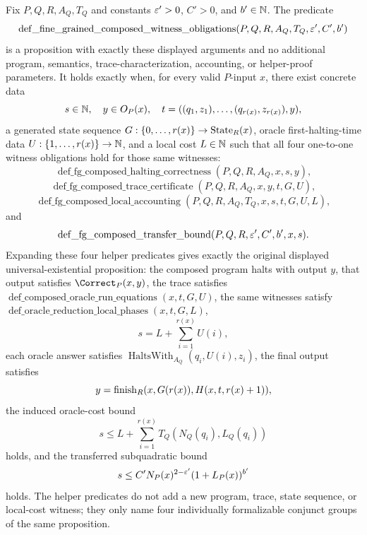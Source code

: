 \begin{definition}
  \label{def:fine-grained-composed-witness-obligations}
  Fix $P,Q,R,A_Q,T_Q$ and constants $\varepsilon'>0$, $C'>0$, and $b'\in\mathbb{N}$.  The
  predicate
  \[
    \operatorname{def\_fine\_grained\_composed\_witness\_obligations}
      (P,Q,R,A_Q,T_Q,\varepsilon',C',b')
  \]
  is a proposition with exactly these displayed arguments and no additional
  program, semantics, trace-characterization, accounting, or helper-proof
  parameters.  It holds exactly when, for every valid $P$-input $x$, there
  exist concrete data
  \[
    s\in\mathbb{N},\quad y\in O_P(x),\quad
    t=((q_1,z_1),\ldots,(q_{r(x)},z_{r(x)}),y),
  \]
  a generated state sequence $G:\{0,\ldots,r(x)\}\to\operatorname{State}_R(x)$, oracle
  first-halting-time data $U:\{1,\ldots,r(x)\}\to\mathbb{N}$, and a local cost
  $L\in\mathbb{N}$ such that all four one-to-one witness obligations hold for those
  same witnesses:
  \[
    \operatorname{def\_fg\_composed\_halting\_correctness}
      (P,Q,R,A_Q,x,s,y),
  \]
  \[
    \operatorname{def\_fg\_composed\_trace\_certificate}
      (P,Q,R,A_Q,x,y,t,G,U),
  \]
  \[
    \operatorname{def\_fg\_composed\_local\_accounting}
      (P,Q,R,A_Q,T_Q,x,s,t,G,U,L),
  \]
  and
  \[
    \operatorname{def\_fg\_composed\_transfer\_bound}
      (P,Q,R,\varepsilon',C',b',x,s).
  \]
  Expanding these four helper predicates gives exactly the original displayed
  universal-existential proposition: the composed program halts with output
  $y$, that output satisfies $\Correct_P(x,y)$, the trace satisfies
  $\operatorname{def\_composed\_oracle\_run\_equations}(x,t,G,U)$, the same
  witnesses satisfy
  $\operatorname{def\_oracle\_reduction\_local\_phases}(x,t,G,L)$,
  \[
    s=L+\sum_{i=1}^{r(x)}U(i),
  \]
  each oracle answer satisfies
  $\operatorname{HaltsWith}_{A_Q}(q_i,U(i),z_i)$, the final output satisfies
  \[
    y=\operatorname{finish}_R(x,G(r(x)),H(x,t,r(x)+1)),
  \]
  the induced oracle-cost bound
  \[
    s\leq
      L+\sum_{i=1}^{r(x)}T_Q(N_Q(q_i),L_Q(q_i))
  \]
  holds, and the transferred subquadratic bound
  \[
    s\leq C' N_P(x)^{2-\varepsilon'}(1+L_P(x))^{b'}
  \]
  holds.  The helper predicates do not add a new program, trace, state
  sequence, or local-cost witness; they only name four individually
  formalizable conjunct groups of the same proposition.
\end{definition}


